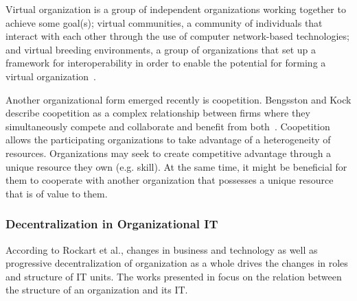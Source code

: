 Virtual organization is a group of independent organizations working together to achieve some goal(s); virtual communities, a community of individuals that interact with each other through the use of computer network-based technologies; and virtual breeding environments, a group of organizations that set up a framework for interoperability in order to enable the potential for forming a virtual organization~\cite{Camarinha-Matos2005}.


Another organizational form emerged recently is coopetition. Bengsston and Kock describe coopetition as a complex relationship between firms where they simultaneously compete and collaborate and benefit from both~\cite{Bengtsson2000}. Coopetition allows the participating organizations to take advantage of a heterogeneity of resources. Organizations may seek to create competitive advantage through a unique resource they own (e.g. skill). At the same time, it might be beneficial for them to cooperate with another organization that possesses a unique resource that is of value to them. 





\subsubsection{Decentralization in Organizational IT}
According to Rockart et al.\cite{Rockart1996}, changes in business and technology as well as progressive decentralization of organization as a whole drives the changes in roles and structure  of IT units. The works presented in \cite{fulk1995, osterloh2000, Rockart1996, Weill2004} focus on the relation between the structure of an organization and its IT. 

